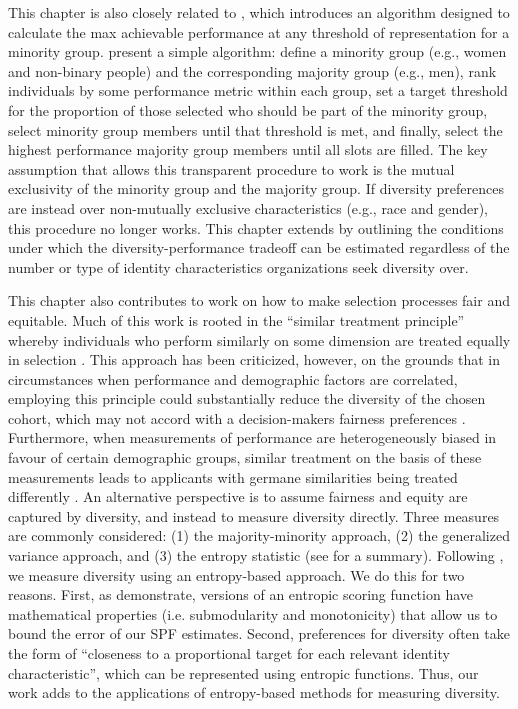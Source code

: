 This chapter is also closely related to \textcite{kleinberg2018algorithmic}, which introduces an algorithm designed to calculate the max achievable performance at any threshold of representation for a minority group. \textcite{kleinberg2018algorithmic} present a simple algorithm: define a minority group (e.g., women and non-binary people) and the corresponding majority group (e.g., men), rank individuals by some performance metric within each group, set a target threshold for the proportion of those selected who should be part of the minority group, select minority group members until that threshold is met, and finally, select the highest performance majority group members until all slots are filled. The key assumption that allows this transparent procedure to work is the mutual exclusivity of the minority group and the majority group. If diversity preferences are instead over non-mutually exclusive characteristics (e.g., race and gender), this procedure no longer works. This chapter extends \textcite{kleinberg2018algorithmic} by outlining the conditions under which the diversity-performance tradeoff can be estimated regardless of the number or type of identity characteristics organizations seek diversity over.

This chapter also contributes to work on how to make selection processes fair and equitable. Much of this work is rooted in the ``similar treatment principle'' whereby individuals who perform similarly on some dimension are treated equally in selection \cite{dwork2012fairness}. This approach has been criticized, however, on the grounds that in circumstances when performance and demographic factors are correlated, employing this principle could substantially reduce the diversity of the chosen cohort, which may not accord with a decision-makers fairness preferences \cite{fleisher2021s}. Furthermore, when measurements of performance are heterogeneously biased in favour of certain demographic groups, similar treatment on the basis of these measurements leads to applicants with germane similarities being treated differently \cite{fleisher2021s}. An alternative perspective is to assume fairness and equity are captured by diversity, and instead to measure diversity directly. Three measures are commonly considered: (1) the majority-minority approach, (2) the generalized variance approach, and (3) the entropy statistic (see \textcite{budescu2012measure} for a summary). Following \textcite{huppenkothen2020entrofy}, we measure diversity using an entropy-based approach. We do this for two reasons. First, as \textcite{huppenkothen2020entrofy} demonstrate, versions of an entropic scoring function have mathematical properties (i.e. submodularity and monotonicity) that allow us to bound the error of our SPF estimates. Second, preferences for diversity often take the form of ``closeness to a proportional target for each relevant identity characteristic'', which can be represented using entropic functions. Thus, our work adds to the applications of entropy-based methods for measuring diversity.

